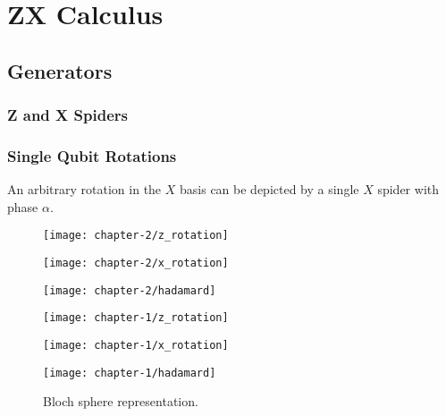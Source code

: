 \chapter{ZX Calculus}

\section{Generators}

\subsection{Z and X Spiders}

\subsection{Single Qubit Rotations}
An arbitrary rotation in the $X$ basis can be depicted by a single $X$ spider with phase $\alpha$.

\begin{figure}[H]
\centering
    \begin{minipage}{.3\textwidth}
      \centering
      \texttt{[image: chapter-2/z\_rotation]}
    \end{minipage}%
    \begin{minipage}{.3\textwidth}
      \centering
      \texttt{[image: chapter-2/x\_rotation]}
    \end{minipage}%
    \begin{minipage}{.3\textwidth}
      \centering
      \texttt{[image: chapter-2/hadamard]}
    \end{minipage}
    \begin{minipage}{.3\textwidth}
      \centering
      \texttt{[image: chapter-1/z\_rotation]}
    \end{minipage}
    \begin{minipage}{.3\textwidth}
      \centering
      \texttt{[image: chapter-1/x\_rotation]}
    \end{minipage}
    \begin{minipage}{.3\textwidth}
      \centering
      \texttt{[image: chapter-1/hadamard]}
    \end{minipage}
    \caption{Bloch sphere representation.}
\end{figure}

